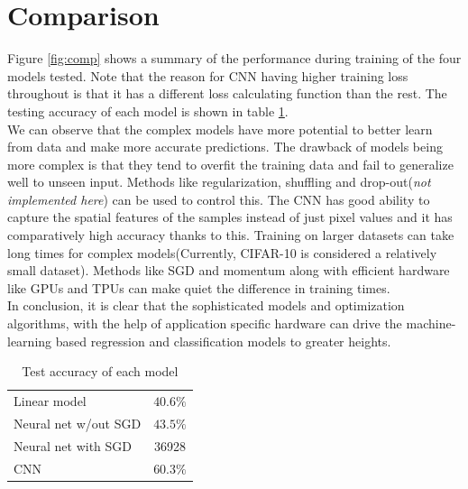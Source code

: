 \documentclass[10pt, a4paper, twocolumn]{article}
\begin{document}
\section{Comparison}
Figure \ref{fig:comp} shows a summary of the performance during training of the four models tested. Note that the reason for CNN having higher training loss throughout is that it has a different loss calculating function than the rest. The testing accuracy of each model is shown in table \ref{table: tab2}.\\
We can observe that the complex models have more potential to better learn from data and make more accurate predictions. The drawback of models being more complex is that they tend to overfit the training data and fail to generalize well to unseen input. Methods like regularization, shuffling and drop-out({\small \textit{not implemented here}}) can be used to control this. The CNN has good ability to capture the spatial features of the samples instead of just pixel values and it has comparatively high accuracy thanks to this. Training on larger datasets can take long times for complex models(Currently, CIFAR-10 is considered a relatively small dataset). Methods like SGD and momentum along with efficient hardware like GPUs and TPUs can make quiet the difference in training times.\\
In conclusion, it is clear that the sophisticated models and optimization algorithms, with the help of application specific hardware can drive the machine-learning based regression and classification models to greater heights.
\begin{table}[H]
\centering
\begin{tabular}{|l|c|}
\hline
Linear model &$40.6\%$\\
Neural net w/out SGD &$43.5\%$\\
Neural net with SGD &36928\\
CNN &$60.3\%$\\
\hline
\end{tabular}
\caption{Test accuracy of each model}
\label{table: tab2}
\end{table}
\end{document}
